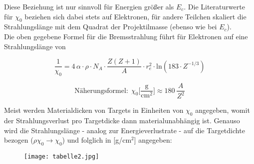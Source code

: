Diese Beziehung ist nur sinnvoll für Energien größer als $E_c$. Die Literaturwerte für $\chi_0$
beziehen sich dabei stets auf Elektronen, für andere Teilchen skaliert die Strahlungslänge mit dem
Quadrat der Projektilmasse (ebenso wie bei $E_c$).
\\
Die oben gegebene Formel für die Bremsstrahlung führt für Elektronen auf eine Strahlungslänge
von 

\[\frac{1}{\chi_0}=4\,\alpha\cdot \rho\cdot N_A \cdot\frac{Z(Z+1)}{A}\cdot
r_e^2\cdot\text{ln}\left(183\cdot Z^{-1/3}\right)\]

\[\text{Näherungsformel:}~~\chi_0\bigg[\frac{\text{g}}{\text{cm}^2}\bigg] \approx
180~\frac{A}{Z^2}\] 

Meist werden Materialdicken von Targets in Einheiten von $\chi_0$ angegeben, womit der
Strahlungsverlust pro Targetdicke dann materialunabhängig ist. Genauso wird die Strahlungslänge -
analog zur Energieverlustrate - auf die Targetdichte bezogen ($\rho \chi_0\rightarrow\chi_0$) und
folglich in [g/cm$^2$] angegeben:

\begin{figure}[H]
	\centering
	\texttt{[image: tabelle2.jpg]}
\end{figure}

\FloatBarrier
